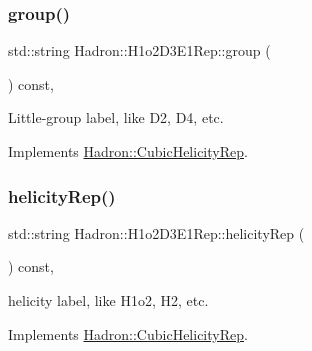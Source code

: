 \mbox{\label{structHadron_1_1H1o2D3E1Rep_a6c9218517ca2797e0d5ee7e92887a916}} 
\subsubsection{\texorpdfstring{group()}{group()}\hspace{0.1cm}{\footnotesize\ttfamily [5/5]}}
{\footnotesize\ttfamily std\+::string Hadron\+::\+H1o2\+D3\+E1\+Rep\+::group (\begin{DoxyParamCaption}{ }\end{DoxyParamCaption}) const\hspace{0.3cm}{\ttfamily [inline]}, {\ttfamily [virtual]}}

Little-\/group label, like D2, D4, etc. 

Implements \mbox{\hyperlink{structHadron_1_1CubicHelicityRep_a101a7d76cd8ccdad0f272db44b766113}{Hadron\+::\+Cubic\+Helicity\+Rep}}.

\mbox{\label{structHadron_1_1H1o2D3E1Rep_a3bdf25355e5b97ee29fab2675ab309a5}} 
\subsubsection{\texorpdfstring{helicityRep()}{helicityRep()}\hspace{0.1cm}{\footnotesize\ttfamily [1/3]}}
{\footnotesize\ttfamily std\+::string Hadron\+::\+H1o2\+D3\+E1\+Rep\+::helicity\+Rep (\begin{DoxyParamCaption}{ }\end{DoxyParamCaption}) const\hspace{0.3cm}{\ttfamily [inline]}, {\ttfamily [virtual]}}

helicity label, like H1o2, H2, etc. 

Implements \mbox{\hyperlink{structHadron_1_1CubicHelicityRep_af1096946b7470edf0a55451cc662f231}{Hadron\+::\+Cubic\+Helicity\+Rep}}.

\mbox{\label{structHadron_1_1H1o2D3E1Rep_a3bdf25355e5b97ee29fab2675ab309a5}} 
